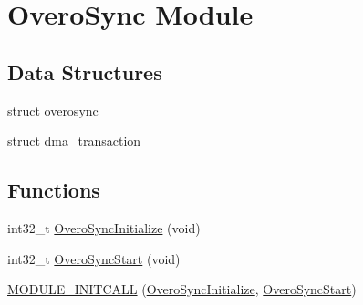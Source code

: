 \hypertarget{group___overo_sync_module}{\section{\-Overo\-Sync \-Module}
\label{group___overo_sync_module}
}
\subsection*{\-Data \-Structures}
\begin{DoxyCompactItemize}
\item 
struct \hyperlink{structoverosync}{overosync}
\item 
struct \hyperlink{structdma__transaction}{dma\-\_\-transaction}
\end{DoxyCompactItemize}
\subsection*{\-Functions}
\begin{DoxyCompactItemize}
\item 
int32\-\_\-t \hyperlink{group___overo_sync_module_gae0e77f24c85219aa88e348edb409cf6c}{\-Overo\-Sync\-Initialize} (void)
\item 
int32\-\_\-t \hyperlink{group___overo_sync_module_gad17ab9f25d8183e8dbaeed2d1e58b788}{\-Overo\-Sync\-Start} (void)
\item 
\hyperlink{group___overo_sync_module_ga90e0f6cdee6c499399c0627e15ffcbd9}{\-M\-O\-D\-U\-L\-E\-\_\-\-I\-N\-I\-T\-C\-A\-L\-L} (\hyperlink{group___overo_sync_module_gae0e77f24c85219aa88e348edb409cf6c}{\-Overo\-Sync\-Initialize}, \hyperlink{group___overo_sync_module_gad17ab9f25d8183e8dbaeed2d1e58b788}{\-Overo\-Sync\-Start})
\end{DoxyCompactItemize}
